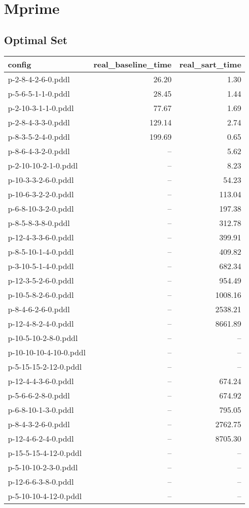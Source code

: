 \documentclass{article}
\begin{document}
                \newpage \section{Mprime}
                    \subsection*{Optimal Set}
                    
                            \begin{center}
                            \scriptsize
                            \begin{tabular}{@{}l|r|r@{}}
                            config & real\_baseline\_time & real\_sart\_time\\\midrule
                             p-2-8-4-2-6-0.pddl&26.20&1.30\\
 p-5-6-5-1-1-0.pddl&28.45&1.44\\
 p-2-10-3-1-1-0.pddl&77.67&1.69\\
 p-2-8-4-3-3-0.pddl&129.14&2.74\\
 p-8-3-5-2-4-0.pddl&199.69&0.65\\
 p-8-6-4-3-2-0.pddl&--&5.62\\
 p-2-10-10-2-1-0.pddl&--&8.23\\
 p-10-3-3-2-6-0.pddl&--&54.23\\
 p-10-6-3-2-2-0.pddl&--&113.04\\
 p-6-8-10-3-2-0.pddl&--&197.38\\
 p-8-5-8-3-8-0.pddl&--&312.78\\
 p-12-4-3-3-6-0.pddl&--&399.91\\
 p-8-5-10-1-4-0.pddl&--&409.82\\
 p-3-10-5-1-4-0.pddl&--&682.34\\
 p-12-3-5-2-6-0.pddl&--&954.49\\
 p-10-5-8-2-6-0.pddl&--&1008.16\\
 p-8-4-6-2-6-0.pddl&--&2538.21\\
 p-12-4-8-2-4-0.pddl&--&8661.89\\
 p-10-5-10-2-8-0.pddl&--&--\\
 p-10-10-10-4-10-0.pddl&--&--\\
 p-5-15-15-2-12-0.pddl&--&--\\
 p-12-4-4-3-6-0.pddl&--&674.24\\
 p-5-6-6-2-8-0.pddl&--&674.92\\
 p-6-8-10-1-3-0.pddl&--&795.05\\
 p-8-4-3-2-6-0.pddl&--&2762.75\\
 p-12-4-6-2-4-0.pddl&--&8705.30\\
 p-15-5-15-4-12-0.pddl&--&--\\
 p-5-10-10-2-3-0.pddl&--&--\\
 p-12-6-6-3-8-0.pddl&--&--\\
 p-5-10-10-4-12-0.pddl&--&--
                            \end{tabular}
                            \end{center}
                    
\end{document}
